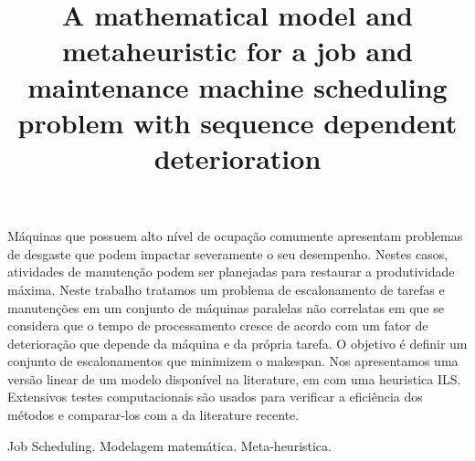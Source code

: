 \documentclass[a4paper,11pt]{article}
\begin{document}
\title{A mathematical model and metaheuristic for a job and maintenance machine scheduling problem with sequence dependent deterioration} 

\maketitle
\thispagestyle{fancy}

%

\vspace{8mm}
\begin{resumo}
M\'aquinas que possuem alto n\'ivel de ocupa\c c\~ao comumente apresentam problemas de desgaste que podem impactar severamente o seu desempenho. Nestes casos, atividades de manuten\c c\~ao podem ser planejadas para restaurar a produtividade m\'axima. Neste trabalho tratamos um problema de escalonamento de tarefas e manuten\c c\~oes em um conjunto de m\'aquinas paralelas n\~ao correlatas em que se considera que o tempo de processamento cresce de acordo com um fator de deteriora\c c\~ao que depende da m\'aquina e da pr\'opria tarefa. O objetivo \'e definir um conjunto de escalonamentos que minimizem o makespan. Nos apresentamos uma vers\~ao linear de um modelo dispon\'ivel na literature, em com uma heuristica ILS. Extensivos testes computacionais s\~ao usados para verificar a efici\^encia dos m\'etodos e comparar-los com a da literature recente. 
 \end{resumo}

\bigskip
\begin{palchaves}
Job Scheduling. Modelagem matem\'atica. Meta-heuristica.

\bigskip
{}
\end{palchaves}


\vspace{8mm}
\end{document}
